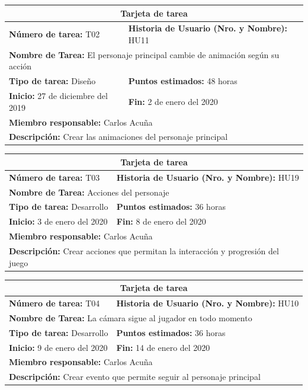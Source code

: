 \documentclass[a4paper, openright, 12pt]{report}
\begin{document}
\begin{longtable}{| p{6cm} | p{6cm} |}
\hline
\multicolumn{2}{|c|}{\textbf{Tarjeta de tarea}} \\
\hline
\textbf{Número de tarea:} T02 & \textbf{Historia de Usuario (Nro. y Nombre):} HU11\\
\hline
\multicolumn{2}{|p{12cm}|}{\textbf{Nombre de Tarea:} El personaje principal cambie de animación según su acción} \\ \hline
\textbf{Tipo de tarea:} Diseño & \textbf{Puntos estimados:} 48 horas  \\ \hline
\textbf{Inicio:} 27 de diciembre del 2019 & \textbf{Fin:} 2 de enero del 2020 \\ \hline
\multicolumn{2}{|p{12cm}|}{\textbf{Miembro responsable:} Carlos Acuña} \\ \hline
\multicolumn{2}{|p{12cm}|}{\textbf{Descripción:} Crear las animaciones del personaje principal} \\ \hline
\end{longtable}

\begin{longtable}{| p{6cm} | p{6cm} |}
\hline
\multicolumn{2}{|c|}{\textbf{Tarjeta de tarea}} \\
\hline
\textbf{Número de tarea:} T03 & \textbf{Historia de Usuario (Nro. y Nombre):} HU19\\
\hline
\multicolumn{2}{|p{12cm}|}{\textbf{Nombre de Tarea:} Acciones del personaje} \\ \hline
\textbf{Tipo de tarea:} Desarrollo & \textbf{Puntos estimados:} 36 horas  \\ \hline
\textbf{Inicio:} 3 de enero del 2020 & \textbf{Fin:} 8 de enero del 2020 \\ \hline
\multicolumn{2}{|p{12cm}|}{\textbf{Miembro responsable:} Carlos Acuña} \\ \hline
\multicolumn{2}{|p{12cm}|}{\textbf{Descripción:} Crear acciones que permitan la interacción y progresión del juego} \\ \hline
\end{longtable}

\clearpage

\begin{longtable}{| p{6cm} | p{6cm} |}
\hline
\multicolumn{2}{|c|}{\textbf{Tarjeta de tarea}} \\
\hline
\textbf{Número de tarea:} T04 & \textbf{Historia de Usuario (Nro. y Nombre):} HU10\\
\hline
\multicolumn{2}{|p{12cm}|}{\textbf{Nombre de Tarea:} La cámara sigue al jugador en todo momento} \\ \hline
\textbf{Tipo de tarea:} Desarrollo & \textbf{Puntos estimados:} 36 horas  \\ \hline
\textbf{Inicio:} 9 de enero del 2020 & \textbf{Fin:} 14 de enero del 2020 \\ \hline
\multicolumn{2}{|p{12cm}|}{\textbf{Miembro responsable:} Carlos Acuña} \\ \hline
\multicolumn{2}{|p{12cm}|}{\textbf{Descripción:} Crear evento que permite seguir al personaje principal} \\ \hline
\end{longtable}
\end{document}
